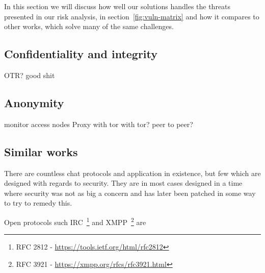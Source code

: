 
In this section we will discuss how well our solutions handles the
threats presented in our risk analysis, in
section~\ref{fig:vuln-matrix} and how it compares to other works,
which solve many of the same challenges.


\subsection{Confidentiality and integrity}
OTR?
good shit


\subsection{Anonymity}
monitor access nodes
Proxy with tor
with tor?
peer to peer?


\subsection{Similar works}

There are countless chat protocols and application in existence, but
few which are designed with regards to security. They are in most
cases designed in a time where security was not as big a concern and
has later been patched in some way to try to remedy this.

Open protocols such IRC~\footnote{RFC 2812 -
  \url{https://tools.ietf.org/html/rfc2812}} and XMPP~\footnote{RFC
  3921 - \url{https://xmpp.org/rfcs/rfc3921.html}} are

